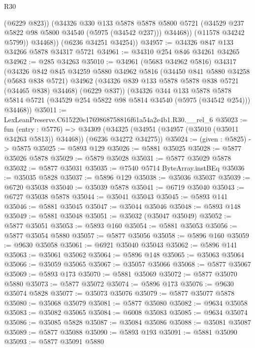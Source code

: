 \begin{lexlean}{R30}
\begin{coremodule}
                (@6229 @823))
              (@34326
                @330
                @133
                @5878
                @5878
                @5800
                @5721
                (@34529 @237 @5822 @98 @5800 @34540 (@5975 (@34542 @237)))
                @34468))
            (@11578 @34242 @5799))
          @34468))
      (@6236 @34251 @34254))
@34957 := @34326 @847 @133 @34266 @5878 @34317 @5721
@34961 := @34310 @254 @846 @34261 @34265
@34962 := @285 @34263
@35010 := @34961
    (@5683 @34962 @5816)
    @34317
    (@34326
      @842
      @845
      @34259
      @5880
      @34962
      @5816
      (@34450
        @841
        @5880
        @34258
        (@5683 @838 @5721)
        @34962
        (@34326 @839 @133 @5878 @5878 @838 @5721 (@34465 @838) @34468)
        (@6229 @837))
      (@34326
        @344
        @133
        @5878
        @5878
        @5814
        @5721
        (@34529 @254 @5822 @98 @5814 @34540 (@5975 (@34542 @254)))
        @34468))
@35011 := LexLeanPreserve.C615220e1769868758816f61a54a2e4b1.R30.__rel_6
@35023 := fun (entry : @5776) =>
  @34309 (@34325 (@34951 (@34957 (@35010 (@35011 @34263 @5813)) @34468)) (@6236 @34272 @34275))
@35024 := (given : @5825) -> @5875
@35025 := @5893 @129
@35026 := @5881 @35025
@35028 := @5877 @35026 @5878
@35029 := @5879 @35028
@35031 := @5877 @35029 @5878
@35032 := @5877 @35031
@35035 := @7540 @5714 ByteArray.instBEq
@35036 := @35035 @5828
@35037 := @5896 @129
@35038 := @35036 @35037
@35039 := @6720 @35038
@35040 := @35039 @5878
@35041 := @6719 @35040
@35043 := @6727 @35038 @5878
@35044 := @35041 @35043
@35045 := @5893 @141
@35046 := @5881 @35045
@35047 := @35044 @35046
@35048 := @5893 @148
@35049 := @5881 @35048
@35051 := @35032 (@35047 @35049)
@35052 := @5877 @35051
@35053 := @5893 @160
@35054 := @5881 @35053
@35056 := @5877 @35054 @5880
@35057 := @5877 @35056
@35058 := @5896 @160
@35059 := @9630 @35058
@35061 := @6921 @35040 @35043
@35062 := @5896 @141
@35063 := @35061 @35062
@35064 := @5896 @148
@35065 := @35063 @35064
@35066 := @35059 @35065
@35067 := @35057 @35066
@35068 := @5877 @35067
@35069 := @5893 @173
@35070 := @5881 @35069
@35072 := @5877 @35070 @5880
@35073 := @5877 @35072
@35074 := @5896 @173
@35076 := @9630 @35074 @5828
@35077 := @35073 @35076
@35079 := @5877 @35077 @5878
@35080 := @35068 @35079
@35081 := @5877 @35080
@35082 := @9634 @35058
@35083 := @35082 @35065
@35084 := @6008 @35083
@35085 := @9634 @35074
@35086 := @35085 @5828
@35087 := @35084 @35086
@35088 := @35081 @35087
@35089 := @5877 @35088
@35090 := @5893 @193
@35091 := @5881 @35090
@35093 := @5877 @35091 @5880

\end{coremodule}
\end{lexlean}
